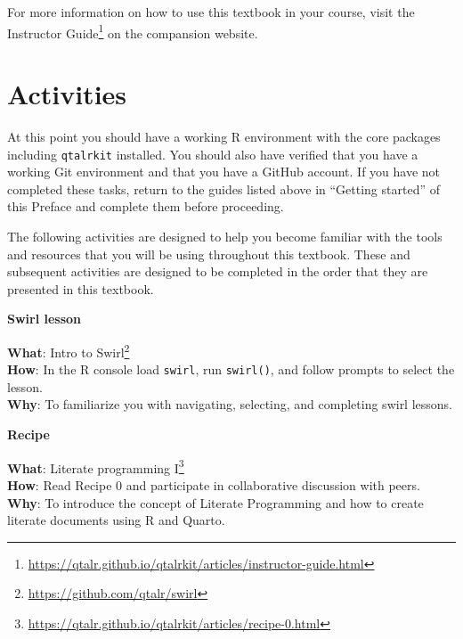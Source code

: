 \documentclass[
  letterpaper,
  DIV=11,
  numbers=noendperiod]{scrreport}
\theoremstyle{definition}
\theoremstyle{remark}
\DeclareRobustCommand{\href}[2]{#2\footnote{\url{#1}}}
\begin{document}
For more information on how to use this textbook in your course, visit
the
\href{https://qtalr.github.io/qtalrkit/articles/instructor-guide.html}{Instructor
Guide} on the compansion website.

\hypertarget{sec-p-activities}{%
\section*{Activities}\label{sec-p-activities}}


At this point you should have a working R environment with the core
packages including \texttt{qtalrkit} installed. You should also have
verified that you have a working Git environment and that you have a
GitHub account. If you have not completed these tasks, return to the
guides listed above in ``Getting started'' of this Preface and complete
them before proceeding.

The following activities are designed to help you become familiar with
the tools and resources that you will be using throughout this textbook.
These and subsequent activities are designed to be completed in the
order that they are presented in this textbook.

\begin{tcolorbox}[enhanced jigsaw, breakable, rightrule=.15mm, arc=.35mm, left=2mm, opacityback=0, leftrule=.75mm, toprule=.15mm, bottomrule=.15mm, colback=white]

\textbf{ Swirl lesson}

\textbf{What}: \href{https://github.com/qtalr/swirl}{Intro to Swirl}\\
\textbf{How}: In the R console load \texttt{swirl}, run
\texttt{swirl()}, and follow prompts to select the lesson.\\
\textbf{Why}: To familiarize you with navigating, selecting, and
completing swirl lessons.

\end{tcolorbox}

\begin{tcolorbox}[enhanced jigsaw, breakable, rightrule=.15mm, arc=.35mm, left=2mm, opacityback=0, leftrule=.75mm, toprule=.15mm, bottomrule=.15mm, colback=white]

\textbf{ Recipe}

\textbf{What}:
\href{https://qtalr.github.io/qtalrkit/articles/recipe-0.html}{Literate
programming I}\\
\textbf{How}: Read Recipe 0 and participate in collaborative discussion
with peers.\\
\textbf{Why}: To introduce the concept of Literate Programming and how
to create literate documents using R and Quarto.

\end{tcolorbox}
\end{document}

